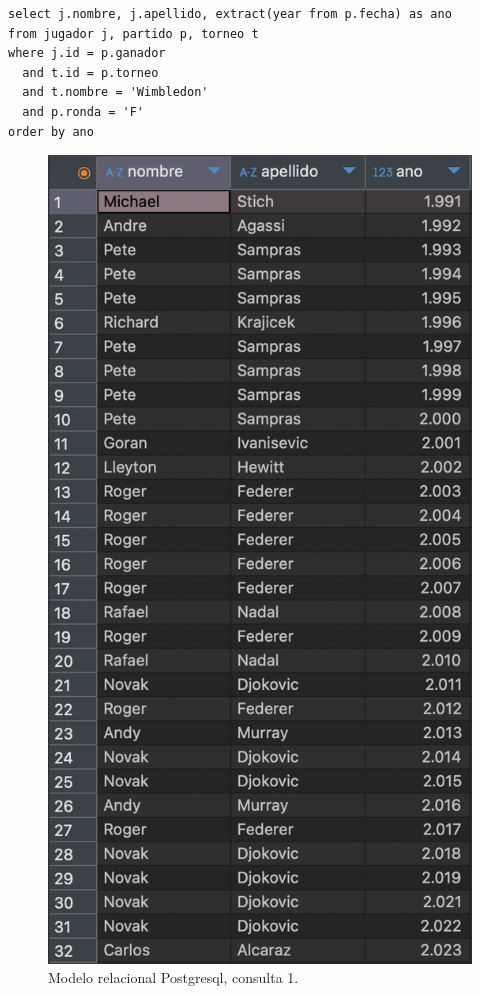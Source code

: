 \begin{verbatim}
select j.nombre, j.apellido, extract(year from p.fecha) as ano
from jugador j, partido p, torneo t
where j.id = p.ganador 
  and t.id = p.torneo 
  and t.nombre = 'Wimbledon' 
  and p.ronda = 'F'
order by ano
\end{verbatim}

\begin{figure}[H]
\centering
\includegraphics[height=0.4\textheight]{fotos/q1_rel.png}
\caption{Modelo relacional Postgresql, consulta 1.}
\label{fig:q1_rel}
\end{figure}



